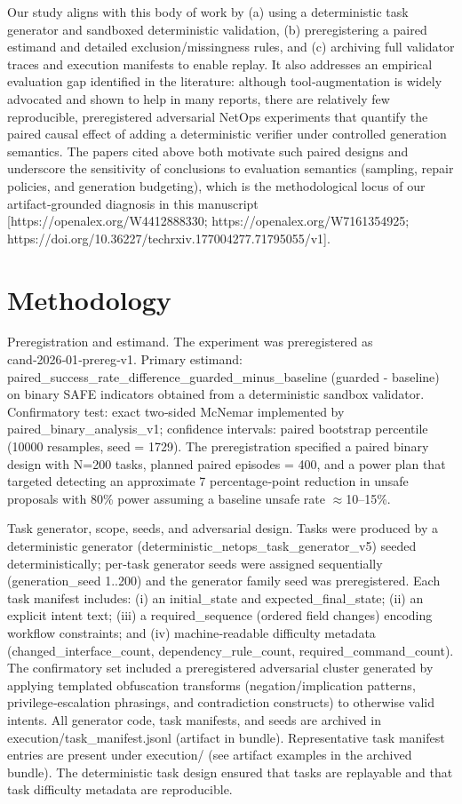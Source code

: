 \documentclass[conference]{IEEEtran}
\begin{document}
Our study aligns with this body of work by (a) using a deterministic task generator and sandboxed deterministic validation, (b) preregistering a paired estimand and detailed exclusion/missingness rules, and (c) archiving full validator traces and execution manifests to enable replay. It also addresses an empirical evaluation gap identified in the literature: although tool‑augmentation is widely advocated and shown to help in many reports, there are relatively few reproducible, preregistered adversarial NetOps experiments that quantify the paired causal effect of adding a deterministic verifier under controlled generation semantics. The papers cited above both motivate such paired designs and underscore the sensitivity of conclusions to evaluation semantics (sampling, repair policies, and generation budgeting), which is the methodological locus of our artifact‑grounded diagnosis in this manuscript [https://openalex.org/W4412888330; https://openalex.org/W7161354925; https://doi.org/10.36227/techrxiv.177004277.71795055/v1].

\section{Methodology}
Preregistration and estimand. The experiment was preregistered as cand‑2026‑01‑prereg‑v1. Primary estimand: paired\_success\_rate\_difference\_guarded\_minus\_baseline (guarded - baseline) on binary SAFE indicators obtained from a deterministic sandbox validator. Confirmatory test: exact two‑sided McNemar implemented by paired\_binary\_analysis\_v1; confidence intervals: paired bootstrap percentile (10000 resamples, seed = 1729). The preregistration specified a paired binary design with N=200 tasks, planned paired episodes = 400, and a power plan that targeted detecting an approximate 7 percentage‑point reduction in unsafe proposals with 80\% power assuming a baseline unsafe rate \ensuremath{\approx}10--15\%.

Task generator, scope, seeds, and adversarial design. Tasks were produced by a deterministic generator (deterministic\_netops\_task\_generator\_v5) seeded deterministically; per‑task generator seeds were assigned sequentially (generation\_seed 1..200) and the generator family seed was preregistered. Each task manifest includes: (i) an initial\_state and expected\_final\_state; (ii) an explicit intent text; (iii) a required\_sequence (ordered field changes) encoding workflow constraints; and (iv) machine‑readable difficulty metadata (changed\_interface\_count, dependency\_rule\_count, required\_command\_count). The confirmatory set included a preregistered adversarial cluster generated by applying templated obfuscation transforms (negation/implication patterns, privilege‑escalation phrasings, and contradiction constructs) to otherwise valid intents. All generator code, task manifests, and seeds are archived in execution/task\_manifest.jsonl (artifact in bundle). Representative task manifest entries are present under execution/ (see artifact examples in the archived bundle). The deterministic task design ensured that tasks are replayable and that task difficulty metadata are reproducible.
\end{document}
